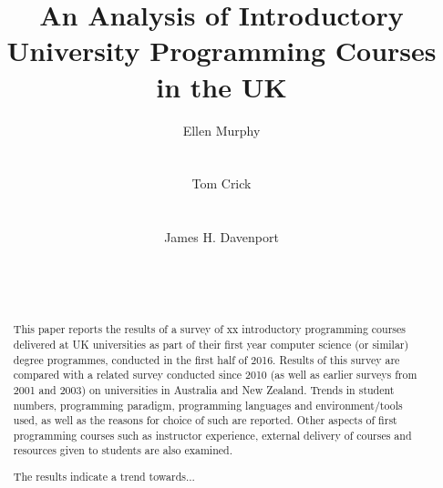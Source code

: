 \documentclass{sig-alternate}
\begin{document}
%

\title{An Analysis of Introductory University Programming Courses in the UK}

\author{
\alignauthor
Ellen Murphy\\
\\
\\
\alignauthor
Tom Crick\\
\\
\\
\alignauthor
James H. Davenport\\
\\
\\
\\
}

\maketitle

\begin{abstract}
This paper reports the results of a survey of xx introductory
programming courses delivered at UK universities as part of their
first year computer science (or similar) degree programmes, conducted
in the first half of 2016. Results of this survey are compared with a
related survey conducted since 2010 (as well as earlier surveys from
2001 and 2003) on universities in Australia and New Zealand. Trends in
student numbers, programming paradigm, programming languages and
environment/tools used, as well as the reasons for choice of such are
reported. Other aspects of first programming courses such as
instructor experience, external delivery of courses and resources
given to students are also examined.

The results indicate a trend towards...
\end{abstract}
\end{document}
